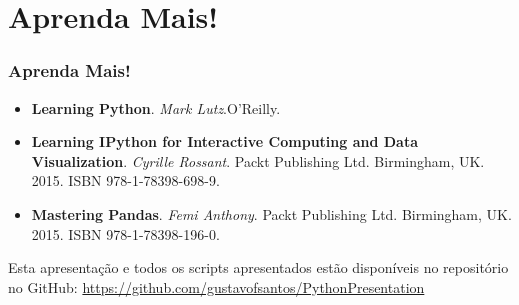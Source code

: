 \documentclass[aspectratio=169]{beamer}
\begin{document}

\section{Aprenda Mais!}

\begin{frame}
	\frametitle{Aprenda Mais!}
	\begin{itemize}
		\item \textbf{Learning Python}. \textit{Mark Lutz}.O'Reilly.
		\item \textbf{Learning IPython for Interactive Computing and Data Visualization}.
\textit{Cyrille Rossant}. Packt Publishing Ltd. Birmingham, UK. 2015. ISBN 978-1-78398-698-9.
		\item \textbf{Mastering Pandas}. \textit{Femi Anthony}. Packt Publishing Ltd.
Birmingham, UK. 2015. ISBN 978-1-78398-196-0.
	\end{itemize}
\end{frame}

\begin{frame}
    Esta apresentação e todos os scripts apresentados estão disponíveis
no repositório no GitHub:
\url{https://github.com/gustavofsantos/PythonPresentation}
\end{frame}

\begin{frame}
\titlepage
\end{frame}
\end{document}
